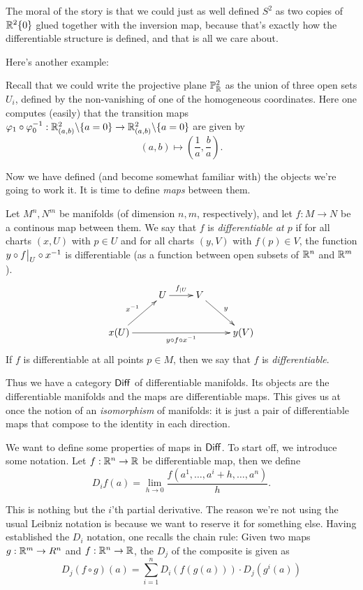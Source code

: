 \documentclass[11pt, english]{article}
\begin{document}
The moral of the story is that we could just as well defined $S^2$ as two copies of $\mathbb{R}^2 \{ 0\}$ glued together with the inversion map, because that's exactly how the differentiable structure is defined, and that is all we care about.

Here's another example:

\begin{example}
Recall that we could write the projective plane $\mathbb{P}_{\mathbb{R}}^2$ as the union of three open sets $U_i$, defined by the non-vanishing of one of the homogeneous coordinates. Here one computes (easily) that the transition maps $\varphi_1 \circ \varphi_0^{-1}:\mathbb{R}^2_{(a,b)} \backslash \{ a = 0 \}  \to \mathbb{R}^2_{(a,b)} \backslash \{ a = 0\}$ are given by \[(a,b) \mapsto \left (\frac{1}{a}, \frac{b}{a} \right).\]
\end{example}

Now we have defined (and become somewhat familiar with) the objects we're going to work it. It is time to define \emph{maps} between them.

\begin{defi}
Let $M^n,N^m$ be manifolds (of dimension $n,m$, respectively), and let $f:M \to N$ be a continous map between them. We say that $f$ is \emph{differentiable at $p$} if for all charts $(x,U)$ with $p \in U$ and for all charts $(y,V)$ with $f(p) \in V$, the function $y \circ \restr fU \circ x^{-1}$ is differentiable (as a function between open subsets of $\mathbb{R}^n$ and $\mathbb{R}^m$).
\[
\xymatrix{
 & U \ar[r]^{f_{|U}} & V \ar[dr]^y \\
x(U) \ar[ur]^{x^{-1}} \ar[rrr]_{y \circ f \circ x^{-1}}  & && y(V)
}
\]
If $f$ is differentiable at all points $p \in M$, then we say that $f$ is \emph{differentiable}.
\end{defi}

Thus we have a category $\mathsf{Diff}$ of differentiable manifolds. Its objects are the differentiable manifolds and the maps are differentiable maps. This gives us at once the notion of an \emph{isomorphism} of manifolds: it is just a pair of differentiable maps that compose to the identity in each direction.

We want to define some properties of maps in $\mathsf{Diff}$. To start off, we introduce some notation. Let $f:\mathbb{R}^n\to\mathbb{R}$ be differentiable map, then we define
\[
D_i f(a) = \lim_{h \to 0} \frac{f(a^1,\dotsc, a^i + h,\dotsc, a^n)}{h}.
\]

This is nothing but the $i$'th partial derivative. The reason we're not using the usual Leibniz notation is because we want to reserve it for something else. Having established the $D_i$ notation, one recalls the chain rule: Given two maps $g:\mathbb{R}^m \to R^n$ and $f:\mathbb{R}^n \to \mathbb{R}$, the $D_j$ of the composite is given as
\[
D_j(f \circ g)(a) = \sum_{i=1}^n  D_i\left(f\left(g\left(a\right)\right)\right) \cdot D_j\left(g^i\left(a\right)\right)
\]
\end{document}
